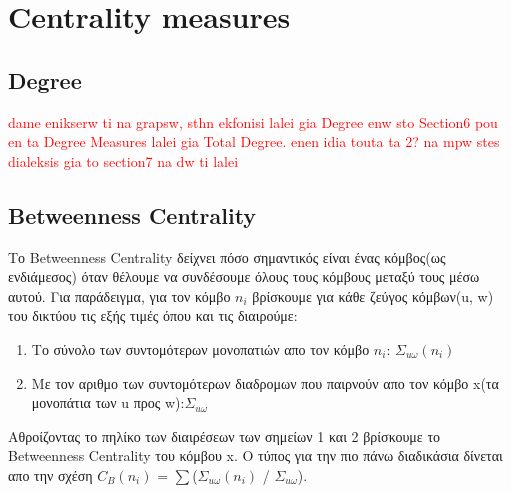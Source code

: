 \documentclass[12pt]{article}
\begin{document}
	
	
	
	
	\newpage
	\section{Centrality measures}
	
	\subsection{Degree}
	\textcolor{red}{dame enikserw ti na grapsw, sthn ekfonisi lalei gia Degree enw sto Section6 pou en ta Degree Measures lalei gia Total Degree. enen idia touta ta 2? na mpw stes dialeksis gia to section7 na dw ti lalei}
	
	\subsection{Betweenness Centrality}
	Το Betweenness Centrality δείχνει πόσο σημαντικός είναι ένας κόμβος(ως ενδιάμεσος) όταν θέλουμε να συνδέσουμε όλους τους κόμβους μεταξύ τους μέσω αυτού. Για παράδειγμα, για τον κόμβο \(n_i\) βρίσκουμε για κάθε ζεύγος κόμβων(u, w) του δικτύου τις εξής τιμές όπου και τις διαιρούμε:
	\begin{enumerate}
		\item Το σύνολο των συντομότερων μονοπατιών απο τον κόμβο \(n_i\): \( \Sigma_{u \omega}(n_i) \)
		\item Με τον αριθμο των συντομότερων διαδρομων που παιρνούν απο τον κόμβο x(τα μονοπάτια των u προς w):\( \Sigma_{u \omega} \)
	\end{enumerate}
	Αθροίζοντας το πηλίκο των διαιρέσεων των σημείων 1 και 2 βρίσκουμε το Betweenness Centrality του κόμβου x.
	Ο τύπος για την πιο πάνω διαδικάσια δίνεται απο την σχέση \(C_B(n_i)\) = $\sum$(\( \Sigma_{u \omega}(n_i) \) / \( \Sigma_{u \omega} \)).
	
\end{document}
